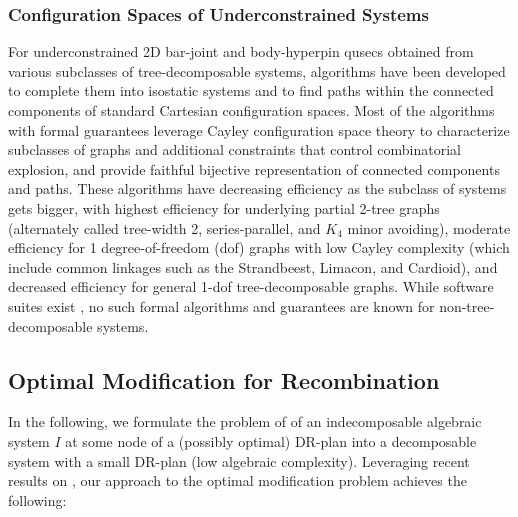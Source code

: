 \subsubsection{Configuration Spaces of Underconstrained Systems}
For underconstrained 2D bar-joint and body-hyperpin qusecs obtained from various subclasses of tree-decomposable systems, algorithms have been developed to complete them into isostatic systems
\cite{joan-arinyo2003transforming,sitharam2005combinatorial,gao2006ctree,sitharam2010convex} and to find paths within the connected components \cite{sitharam2011cayleyI,hidalgo2011reachability} of standard Cartesian configuration spaces. Most of the algorithms with formal guarantees leverage Cayley configuration space theory \cite{sitharam2010convex,sitharam2011cayleyI,sitharam2011cayleyII} to characterize subclasses of graphs and additional constraints that control combinatorial explosion, and provide faithful bijective representation of connected components and paths. These algorithms have decreasing efficiency as the subclass of systems gets bigger, with highest efficiency for underlying partial 2-tree graphs (alternately called tree-width 2, series-parallel, and $K_4$ minor avoiding), moderate efficiency for 1 degree-of-freedom (dof) graphs with low Cayley complexity (which include common linkages such as the Strandbeest, Limacon, and Cardioid), and decreased efficiency for general 1-dof tree-decomposable graphs. While software suites exist  \cite{keycurriculum1995geometer,porta2014open,siemens1999d,todd2007geometry}, no such formal algorithms and guarantees are known for non-tree-decomposable systems.

\subsection{Optimal Modification for Recombination}
In the following, we formulate the problem of  of an indecomposable algebraic system $I$ at some node of a (possibly optimal) DR-plan into a decomposable system with a small DR-plan (low algebraic complexity). Leveraging recent results on , our approach to the optimal modification problem achieves the following:

